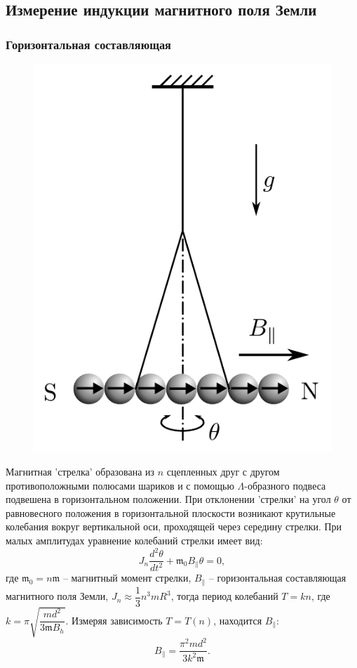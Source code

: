 \documentclass[12pt,a4paper]{article}
\begin{document}
	\subsection*{Измерение индукции магнитного поля Земли}
	
	\subsubsection*{Горизонтальная составляющая}
	\begin{figure}
		\vspace{30pt}
		\includegraphics[width=0.8\linewidth]{res/horizontal.png}
	\end{figure}
 
	Магнитная 'стрелка' образована из $n$ сцепленных друг с другом противоположными полюсами шариков и с помощью $\Lambda$-образного подвеса подвешена в горизонтальном положении. При отклонении 'стрелки' на угол $\theta$ от равновесного положения в горизонтальной плоскости возникают крутильные колебания вокруг вертикальной оси, проходящей через середину стрелки. При малых амплитудах уравнение колебаний
	стрелки имеет вид:
	$$ J_n \dfrac{d^2 \theta}{dt^2} + \mathfrak{m}_0 B_{\parallel} \theta = 0, $$ 
	где $\mathfrak{m}_0 = n \mathfrak{m}$ -- магнитный момент стрелки, $B_{\parallel}$ -- горизонтальная составляющая магнитного поля Земли, $J_n \approx \dfrac{1}{3}n^3 m R^3$, тогда период колебаний $T = kn$, где $k = \pi \sqrt{\dfrac{md^2}{3 \mathfrak{m} B_h}}$. Измеряя зависимость $T=T(n)$, находится $B_{\parallel}$:
	$$ B_{\parallel} = \dfrac{\pi^2 m d^2}{3k^2\mathfrak{m}}. $$
	
\end{document}
